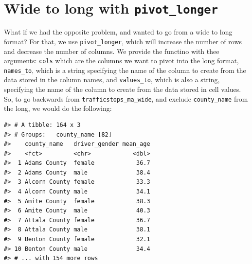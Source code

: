 \documentclass[]{book}
\newenvironment{Shaded}{\begin{snugshade}}{\end{snugshade}}
\newcommand{\CommentTok}[1]{\textcolor[rgb]{0.56,0.35,0.01}{\textit{#1}}}
\newcommand{\DataTypeTok}[1]{\textcolor[rgb]{0.13,0.29,0.53}{#1}}
\newcommand{\KeywordTok}[1]{\textcolor[rgb]{0.13,0.29,0.53}{\textbf{#1}}}
\newcommand{\NormalTok}[1]{#1}
\newcommand{\OperatorTok}[1]{\textcolor[rgb]{0.81,0.36,0.00}{\textbf{#1}}}
\newcommand{\StringTok}[1]{\textcolor[rgb]{0.31,0.60,0.02}{#1}}
\begin{document}
\hypertarget{wide-to-long-with-pivot_longer}{%
\section{\texorpdfstring{Wide to long with \texttt{pivot\_longer}}{Wide to long with pivot\_longer}}\label{wide-to-long-with-pivot_longer}}

What if we had the opposite problem, and wanted to go from a wide to long
format? For that, we use \texttt{pivot\_longer}, which will increase the number of rows and decrease the number of columns. We provide the functino with thee arguments: \texttt{cols} which are the columns we want to pivot into the long format, \texttt{names\_to}, which is a string specifying the name of the column to create from the data stored in the column names, and \texttt{values\_to}, which is also a string, specifying the name of the column to create from the data stored in cell values.
So, to go backwards from \texttt{trafficstops\_ma\_wide}, and exclude \texttt{county\_name} from the long, we would do the following:

\begin{Shaded}
\end{Shaded}

\begin{verbatim}
#> # A tibble: 164 x 3
#> # Groups:   county_name [82]
#>    county_name   driver_gender mean_age
#>    <fct>         <chr>            <dbl>
#>  1 Adams County  female            36.7
#>  2 Adams County  male              38.4
#>  3 Alcorn County female            33.3
#>  4 Alcorn County male              34.1
#>  5 Amite County  female            38.3
#>  6 Amite County  male              40.3
#>  7 Attala County female            36.7
#>  8 Attala County male              38.1
#>  9 Benton County female            32.1
#> 10 Benton County male              34.4
#> # ... with 154 more rows
\end{verbatim}
\end{document}
